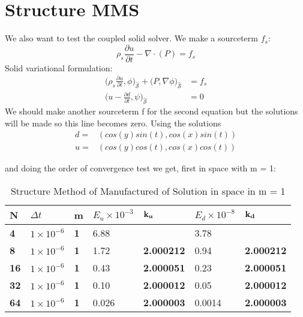 \section{Structure MMS}
We also want to test the coupled solid solver. We make a sourceterm $f_s$:
$$\rho_s \frac{\partial u}{\partial t} - \nabla \cdot ( P ) = f_s $$
Solid variational formulation:
\begin{align}
\big(\rho_s \frac{\partial u}{\partial t},\phi \big)_{\mathcal{\hat{S}}} + \big(P, \nabla \phi \big)_{\mathcal{\hat{S}}} &=f_s \\
\big( u- \frac{\partial d}{\partial t} ,\psi \big)_{\mathcal{\hat{S}}} &= 0 
\end{align}
We should make another sourceterm f for the second equation but the solutions will be made so this line becomes zero.
Using the solutions 
\begin{align*}
d =& ( cos(y)sin(t) , cos(x)sin(t) )\\
u =& ( cos(y)cos(t), cos(x)cos(t) )
\end{align*}



and doing the order of convergence test we get, first in space with m = 1:

\begin{table}[H]
\centering
\caption{Structure Method of Manufactured of Solution in space in m = 1}
\label{my-label}
\begin{tabular}{|l|l|l|l|l|l|l|}
\hline
\textbf{N}  & $\Delta t$  & \textbf{m} & $E_u \times 10^{-3}$ & $\bold{k_u}$    & $E_d \times 10^{-8}$ & $\bold{k_d}$    \\ \hline
\textbf{4}  & $1\times10^{-6}$ & \textbf{1} & 6.88                 & \textbf{}         & 3.78                 & \textbf{}         \\ \hline
\textbf{8}  & $1\times10^{-6}$ & \textbf{1} & 1.72                 & \textbf{2.000212} & 0.94                 & \textbf{2.000212} \\ \hline
\textbf{16} & $1\times10^{-6}$ & \textbf{1} & 0.43                 & \textbf{2.000051} & 0.23                 & \textbf{2.000051} \\ \hline
\textbf{32} & $1\times10^{-6}$ & \textbf{1} & 0.10                 & \textbf{2.000012} & 0.05                 & \textbf{2.000012} \\ \hline
\textbf{64} & $1\times10^{-6}$ & \textbf{1} & 0.026                & \textbf{2.000003} & 0.0014               & \textbf{2.000003} \\ \hline
\end{tabular}
\end{table}

